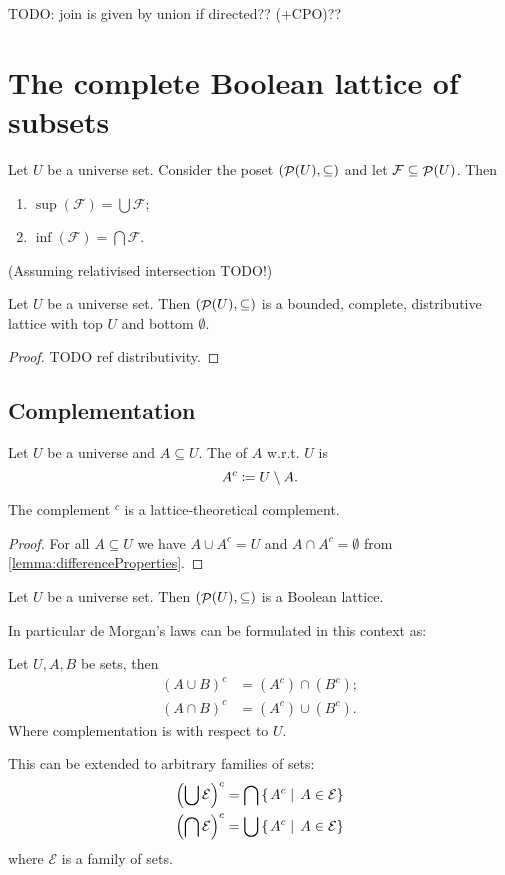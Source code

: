 TODO: join is given by union if directed?? (+CPO)??

\section{The complete Boolean lattice of subsets}
\begin{lemma}
Let $U$ be a universe set. Consider the poset $\left( \mathop{\mathcal{P}}(U), \subseteq \right)$ and let $\mathcal{F}\subseteq \mathop{\mathcal{P}}(U)$. Then
\begin{enumerate}
\item $\sup(\mathcal{F}) = \bigcup \mathcal{F}$;
\item $\inf(\mathcal{F}) = \bigcap \mathcal{F}$.
\end{enumerate}
(Assuming relativised intersection TODO!)
\end{lemma}
\begin{corollary}
Let $U$ be a universe set. Then $\left( \mathop{\mathcal{P}}(U), \subseteq \right)$ is a bounded, complete, distributive lattice with top $U$ and bottom $\emptyset$.
\end{corollary}
\begin{proof}
TODO ref distributivity.
\end{proof}

\subsection{Complementation}
\begin{definition}
Let $U$ be a universe and $A\subseteq U$. The  of $A$ w.r.t. $U$ is
\[ A^c \coloneqq U\setminus A. \]
\end{definition}

\begin{lemma}
The complement $^c$ is a lattice-theoretical complement.
\end{lemma}
\begin{proof}
For all $A\subseteq U$ we have $A\cup A^c = U$ and $A\cap A^c = \emptyset$ from \ref{lemma:differenceProperties}.
\end{proof}
\begin{corollary}
Let $U$ be a universe set. Then $\left( \mathop{\mathcal{P}}(U), \subseteq \right)$ is a Boolean lattice.
\end{corollary}

In particular de Morgan's laws can be formulated in this context as:
\begin{proposition}
Let $U,A,B$ be sets, then
\begin{align*}
(A\cup B)^c &= (A^c)\cap (B^c); \\
(A\cap B)^c &= (A^c)\cup (B^c).
\end{align*}
Where complementation is with respect to $U$.

This can be extended to arbitrary families of sets:
\begin{align*}
\left(\bigcup \mathcal{E}\right)^c &= \bigcap\left\{\left. A^c \;\right|\; A\in\mathcal{E} \right\} \\
\left(\bigcap \mathcal{E}\right)^c &= \bigcup\left\{\left. A^c \;\right|\; A\in\mathcal{E} \right\}
\end{align*}
where $\mathcal{E}$ is a family of sets.
\end{proposition}

